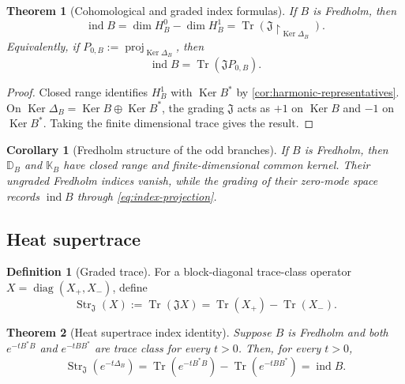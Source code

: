 \documentclass[11pt,reqno]{scrartcl}
\newcommand{\fundJ}{\mathfrak J}
\newcommand{\DB}{\mathbb D}
\newcommand{\KB}{\mathbb K}
\newcommand{\DeltaB}{\Delta}
\DeclareMathOperator{\Ker}{Ker}
\DeclareMathOperator{\diag}{diag}
\DeclareMathOperator{\ind}{ind}
\DeclareMathOperator{\Tr}{Tr}
\newcommand{\restr}[2]{#1\!\upharpoonright_{#2}}
\theoremstyle{plain}
\newtheorem{theorem}{Theorem}[section]
\newtheorem{corollary}[corollary]{Corollary}
\theoremstyle{definition}
\newtheorem{definition}[definition]{Definition}
\theoremstyle{remark}
\begin{document}
\begin{theorem}[Cohomological and graded index formulas]
\label{thm:index-formulas}
If \(B\) is Fredholm, then
\begin{equation}
  \boxed{
  \ind B
  =\dim H_B^0-\dim H_B^1
  =\Tr\!\left(\restr{\fundJ}{\Ker\DeltaB_B}\right).}
  \label{eq:index-formulas}
\end{equation}
Equivalently, if \(P_{0,B}:=\operatorname{proj}_{\Ker\DeltaB_B}\), then
\begin{equation}
  \ind B=\Tr(\fundJ P_{0,B}).
  \label{eq:index-projection}
\end{equation}
\end{theorem}

\begin{proof}
Closed range identifies \(H_B^1\) with \(\Ker B^*\) by
\cref{cor:harmonic-representatives}.  On
\(\Ker\DeltaB_B=\Ker B\oplus\Ker B^*\), the grading \(\fundJ\) acts as
\(+1\) on \(\Ker B\) and \(-1\) on \(\Ker B^*\).  Taking the finite
dimensional trace gives the result.
\end{proof}

\begin{corollary}[Fredholm structure of the odd branches]
\label{cor:odd-Fredholm}
If \(B\) is Fredholm, then \(\DB_B\) and \(\KB_B\) have closed range and
finite-dimensional common kernel.  Their ungraded Fredholm indices vanish,
while the grading of their zero-mode space records \(\ind B\) through
\eqref{eq:index-projection}.
\end{corollary}

\subsection{Heat supertrace}

\begin{definition}[Graded trace]
For a block-diagonal trace-class operator
\(X=\diag(X_+,X_-)\), define
\begin{equation}
  \operatorname{Str}_{\fundJ}(X)
  :=\Tr(\fundJ X)
  =\Tr(X_+)-\Tr(X_-).
  \label{eq:supertrace}
\end{equation}
\end{definition}

\begin{theorem}[Heat supertrace index identity]
\label{thm:heat-index}
Suppose \(B\) is Fredholm and both \(e^{-tB^*B}\) and
\(e^{-tBB^*}\) are trace class for every \(t>0\).  Then, for every
\(t>0\),
\begin{equation}
  \boxed{
  \operatorname{Str}_{\fundJ}(e^{-t\DeltaB_B})
  =\Tr(e^{-tB^*B})-\Tr(e^{-tBB^*})
  =\ind B.}
  \label{eq:heat-index}
\end{equation}
\end{theorem}
\end{document}
